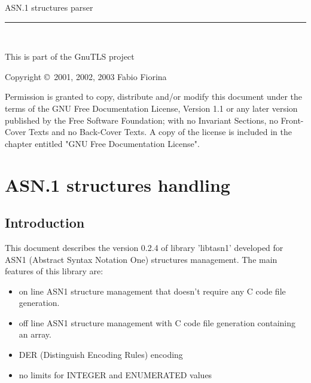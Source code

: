 \documentclass{book}
\newcommand{\HRule}{\rule{\linewidth}{0.4mm}}
\begin{document}
{\Large{ASN.1 structures parser}}
\vspace{-.3cm}
\\
\HRule
\vspace{-.6cm}
\\
\begin{flushright}
This is part of the GnuTLS project\\
\end{flushright}


\begin{center}
\par
Copyright \copyright\ 2001, 2002, 2003  Fabio Fiorina\\
\setlength{\parskip}{4mm}
\par
Permission is granted to copy, distribute and/or modify this
document under the terms of the GNU Free Documentation License,
Version 1.1 or any later version published by the Free Software
Foundation; with no Invariant Sections, no Front-Cover Texts and
no Back-Cover Texts.  A copy of the license is included in the
chapter entitled "GNU Free Documentation License".
\end{center}

\setlength{\parindent}{2mm}

\setlength{\parskip}{1mm}

\tableofcontents

\chapter{ASN.1 structures handling}

\section{Introduction}
 This document describes the version 0.2.4 of library 'libtasn1' developed
for ASN1 (Abstract Syntax Notation One) structures management.
The main features of this library are:
\begin{itemize}
\item on line ASN1 structure management that doesn't require any
C code file generation.
\item off line ASN1 structure management with C code file generation 
containing an array.
\item DER (Distinguish Encoding Rules) encoding
\item no limits for INTEGER and ENUMERATED values  
\end{itemize}
\end{document}
